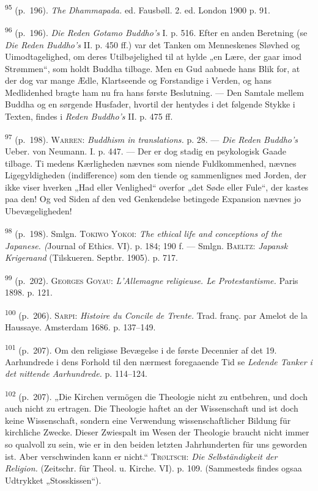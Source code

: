 \documentclass[12pt,a4paper,openany]{book}
\newcommand{\opage}[1]{\marginnote{\footnotesize\textit{[#1]}}}
\begin{document}
\begin{small}
\textsuperscript{95} (p.~196). \textit{The Dhammapada.} ed. Fausbøll. 2.
ed. London 1900 p. 91.

\textsuperscript{96} (p.~196). \textit{Die Reden Gotamo Buddho’s} I. p.
516. Efter en anden Beretning
(se \textit{Die Reden Buddho’s} II. p. 450 ff.) var det Tanken om
Menneskenes Sløvhed og Uimodtagelighed, om deres Utilbøjelighed til at
hylde „en Lære, der gaar imod Strømmen“, som holdt Buddha tilbage. Men
en Gud aabnede hans Blik for, at der dog var mange Ædle, Klartseende og
Forstandige i Verden, og hans Medlidenhed bragte ham nu fra hans første
Beslutning. --- Den Samtale mellem Buddha og en sørgende Husfader,
hvortil der hentydes i det følgende Stykke i Texten, findes i
\textit{Reden Buddho’s} II. p. 475 ff.

\textsuperscript{97} (p.~198). \textsc{Warren}: \textit{Buddhism in
translations.} p. 28. ---
\textit{Die Reden Buddho’s} Ueber. von Neumann. I. p. 447. --- Der er
dog stadig en psykologisk Gaade tilbage. Ti medens Kærligheden nævnes
som niende Fuldkommenhed, nævnes Ligegyldigheden (indifference) som den
tiende og sammenlignes med Jorden, der ikke viser hverken „Had eller
Venlighed“ overfor „det Søde eller Fule“, der kastes paa den! Og ved
Siden af den ved Genkendelse betingede Expansion nævnes jo
Ubevægeligheden!

\textsuperscript{98} (p.~198). Smlgn. \textsc{Tokiwo Yokoi}: \textit{The
ethical life and conceptions
of the Japanese. (}Journal of Ethics. VI). p. 184; 190 f. --- Smlgn.
\textsc{Baeltz}: \textit{Japansk Krigeraand} (Tilskueren. Septbr. 1905).
p. 717.

\textsuperscript{99} (p.~202). \textsc{Georges Goyau}:
\textit{L’Allemagne religieuse. Le
Protestantisme.} Paris 1898. p. 121.

\textsuperscript{100} (p.~206). \textsc{Sarpi}: \textit{Histoire du
Concile de Trente.} Trad. franç. par
Amelot de la Haussaye. Amsterdam 1686. p. 137--149.

\opage{255}\textsuperscript{101} (p.~207). Om den religiøse Bevægelse i
de første Decennier af det 19. Aarhundrede
i dens Forhold til den nærmest foregaaende Tid se \textit{Ledende Tanker
i det nittende Aarhundrede.} p. 114--124.

\textsuperscript{102} (p.~207). „Die Kirchen vermögen die Theologie
nicht zu entbehren, und doch auch
nicht zu ertragen. Die Theologie haftet an der Wissenschaft und ist doch
keine Wissenschaft, sondern eine Verwendung wissenschaftlicher Bildung
für kirchliche Zwecke. Dieser Zwiespalt im Wesen der Theologie braucht
nicht immer so qualvoll zu sein, wie er in den beiden letzten
Jahrhunderten für uns geworden ist. Aber verschwinden kann er nicht.“
\textsc{Trøltsch}: \textit{Die Selbständigkeit der Religion.} (Zeitschr.
für Theol. u. Kirche. VI). p. 109. (Sammesteds findes ogsaa Udtrykket
„Stosskissen“).


\end{small}
\end{document}
